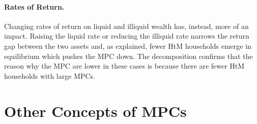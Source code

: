 \paragraph{Rates of Return.}
Changing rates of return on liquid and illiquid wealth has, instead, more of an impact. Raising the liquid rate or reducing the illiquid rate narrows the return gap between the two assets and, as explained, fewer HtM households emerge in equilibrium which pushes the MPC down. The decomposition confirms that the reason why the MPC are lower in these cases is because there are fewer HtM households with large MPCs.


\section{Other Concepts of MPCs}


